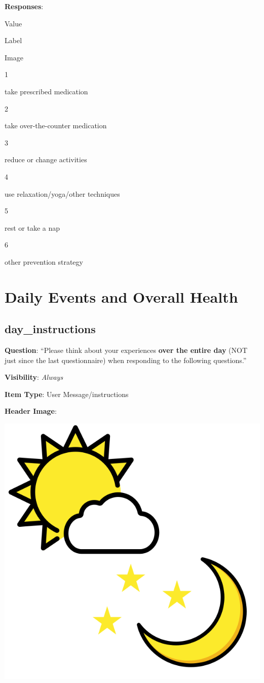 \documentclass[]{book}
\begin{document}
\textbf{Responses}:

Value

Label

Image

1

take prescribed medication

2

take over-the-counter medication

3

reduce or change activities

4

use relaxation/yoga/other techniques

5

rest or take a nap

6

other prevention strategy

\hypertarget{daily_section}{%
\chapter{Daily Events and Overall Health}\label{daily_section}}

\hypertarget{day_instructions}{%
\section{day\_instructions}\label{day_instructions}}

\textbf{Question}: ``Please think about your experiences \textbf{over the entire day} (NOT just since the last questionnaire) when responding to the following questions.''

\textbf{Visibility}: \emph{Always}

\textbf{Item Type}: User Message/instructions

\textbf{Header Image}:

\begin{flushleft}\includegraphics[width=0.33\linewidth]{downloadFigs4latex_NIMH_Applet_Codebook/day_instructions_headerImg} \end{flushleft}
\end{document}
